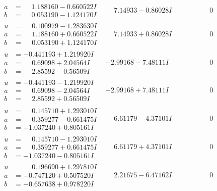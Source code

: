\documentclass[1p]{elsarticle_modified}
\theoremstyle{definition}
\begin{document}
$$\begin{array}{c|c|c}
\begin{aligned}
a &= \phantom{-}1.188160 - 0.660522 I \\
b &= \phantom{-}0.053190 - 1.124170 I\end{aligned}
 & \phantom{-}7.14933 - 0.86028 I & \phantom{-0.000000 } 0 \\ \hline\begin{aligned}
u &= \phantom{-}0.100979 - 1.283630 I \\
a &= \phantom{-}1.188160 + 0.660522 I \\
b &= \phantom{-}0.053190 + 1.124170 I\end{aligned}
 & \phantom{-}7.14933 + 0.86028 I & \phantom{-0.000000 } 0 \\ \hline\begin{aligned}
u &= -0.441193 + 1.219920 I \\
a &= \phantom{-}0.69098 + 2.04564 I \\
b &= \phantom{-}2.85592 - 0.56509 I\end{aligned}
 & -2.99168 - 7.48111 I & \phantom{-0.000000 } 0 \\ \hline\begin{aligned}
u &= -0.441193 - 1.219920 I \\
a &= \phantom{-}0.69098 - 2.04564 I \\
b &= \phantom{-}2.85592 + 0.56509 I\end{aligned}
 & -2.99168 + 7.48111 I & \phantom{-0.000000 } 0 \\ \hline\begin{aligned}
u &= \phantom{-}0.145710 + 1.293010 I \\
a &= \phantom{-}0.359277 - 0.661475 I \\
b &= -1.037240 + 0.805161 I\end{aligned}
 & \phantom{-}6.61179 - 4.37101 I & \phantom{-0.000000 } 0 \\ \hline\begin{aligned}
u &= \phantom{-}0.145710 - 1.293010 I \\
a &= \phantom{-}0.359277 + 0.661475 I \\
b &= -1.037240 - 0.805161 I\end{aligned}
 & \phantom{-}6.61179 + 4.37101 I & \phantom{-0.000000 } 0 \\ \hline\begin{aligned}
u &= \phantom{-}0.196690 + 1.297810 I \\
a &= -0.747120 + 0.507520 I \\
b &= -0.657638 + 0.978220 I\end{aligned}
 & \phantom{-}2.21675 - 6.47162 I & \phantom{-0.000000 } 0 \\ \hline\begin{aligned}

\end{aligned}
\end{array}$$
\end{document}
